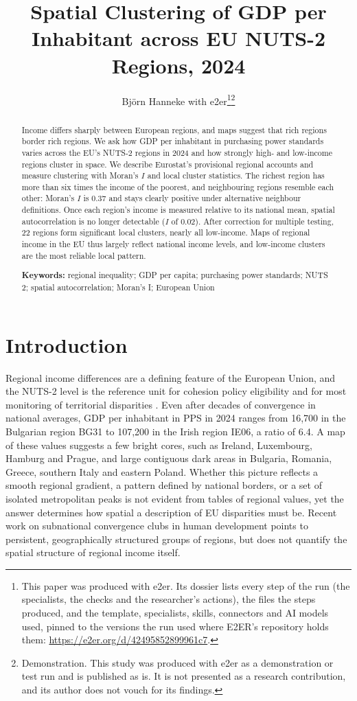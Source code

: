 \documentclass[11pt]{article}
\title{Spatial Clustering of GDP per Inhabitant across EU NUTS-2 Regions, 2024}
\author{Björn Hanneke with e2er\thanks{This paper was produced with e2er. Its dossier lists every step of the run (the specialists, the checks and the researcher's actions), the files the steps produced, and the template, specialists, skills, connectors and AI models used, pinned to the versions the run used where E2ER's repository holds them: \url{https://e2er.org/d/42495852899961c7}.}\thanks{Demonstration. This study was produced with e2er as a demonstration or test run and is published as is. It is not presented as a research contribution, and its author does not vouch for its findings.}}
\date{}
\begin{document}
\maketitle

\begin{abstract}
\noindent Income differs sharply between European regions, and maps suggest that rich regions border rich regions. We ask how GDP per inhabitant in purchasing power standards varies across the EU's NUTS-2 regions in 2024 and how strongly high- and low-income regions cluster in space. We describe Eurostat's provisional regional accounts and measure clustering with Moran's $I$ and local cluster statistics. The richest region has more than six times the income of the poorest, and neighbouring regions resemble each other: Moran's $I$ is 0.37 and stays clearly positive under alternative neighbour definitions.
Once each region's income is measured relative to its national mean, spatial autocorrelation is no longer detectable ($I$ of 0.02).
After correction for multiple testing, 22 regions form significant local clusters, nearly all low-income.
Maps of regional income in the EU thus largely reflect national income levels, and low-income clusters are the most reliable local pattern.

\medskip
\noindent\textbf{Keywords:} regional inequality; GDP per capita; purchasing power standards; NUTS 2; spatial autocorrelation; Moran's I; European Union
\end{abstract}

\section{Introduction}

Regional income differences are a defining feature of the European Union, and the NUTS-2 level is the reference unit for cohesion policy eligibility and for most monitoring of territorial disparities \citep{Eurostat_Database}. Even after decades of convergence in national averages, GDP per inhabitant in PPS in 2024 ranges from 16,700 in the Bulgarian region BG31 to 107,200 in the Irish region IE06, a ratio of 6.4. A map of these values suggests a few bright cores, such as Ireland, Luxembourg, Hamburg and Prague, and large contiguous dark areas in Bulgaria, Romania, Greece, southern Italy and eastern Poland. Whether this picture reflects a smooth regional gradient, a pattern defined by national borders, or a set of isolated metropolitan peaks is not evident from tables of regional values, yet the answer determines how spatial a description of EU disparities must be. Recent work on subnational convergence clubs in human development \citep{pourpakdelfekr2026multispeed} points to persistent, geographically structured groups of regions, but does not quantify the spatial structure of regional income itself.
\end{document}
